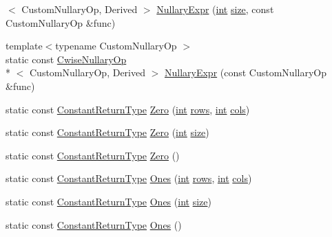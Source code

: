 \begin{DoxyCompactItemize}
$<$ Custom\-Nullary\-Op, Derived $>$ \hyperlink{class_matrix_base_ab4e21b9cfde1b10b11f083f8abf94bb7}{Nullary\-Expr} (\hyperlink{ioapi_8h_a787fa3cf048117ba7123753c1e74fcd6}{int} \hyperlink{glext_8h_a014d89bd76f74ef3a29c8f04b473eb76}{size}, const Custom\-Nullary\-Op \&func)
\item 
{\footnotesize template$<$typename Custom\-Nullary\-Op $>$ }\\static const \hyperlink{class_cwise_nullary_op}{Cwise\-Nullary\-Op}\\*
$<$ Custom\-Nullary\-Op, Derived $>$ \hyperlink{class_matrix_base_a87527d29571c883b86641ddc9cea57eb}{Nullary\-Expr} (const Custom\-Nullary\-Op \&func)
\item 
static const \hyperlink{class_matrix_base_aa9bcfa09043d1337c3575f008d3e04da}{Constant\-Return\-Type} \hyperlink{class_matrix_base_a29517bfa81dd52a8c7302d1902a99c2a}{Zero} (\hyperlink{ioapi_8h_a787fa3cf048117ba7123753c1e74fcd6}{int} \hyperlink{class_matrix_base_ae82810ba95da637cdf434b4274083723}{rows}, \hyperlink{ioapi_8h_a787fa3cf048117ba7123753c1e74fcd6}{int} \hyperlink{class_matrix_base_abe5381b539f87237647bc651a1ac0364}{cols})
\item 
static const \hyperlink{class_matrix_base_aa9bcfa09043d1337c3575f008d3e04da}{Constant\-Return\-Type} \hyperlink{class_matrix_base_a2b608114f7a813907b66ea1bb0dd33a3}{Zero} (\hyperlink{ioapi_8h_a787fa3cf048117ba7123753c1e74fcd6}{int} \hyperlink{glext_8h_a014d89bd76f74ef3a29c8f04b473eb76}{size})
\item 
static const \hyperlink{class_matrix_base_aa9bcfa09043d1337c3575f008d3e04da}{Constant\-Return\-Type} \hyperlink{class_matrix_base_a80d399408db12eb60957efa2d7e8d4a9}{Zero} ()
\item 
static const \hyperlink{class_matrix_base_aa9bcfa09043d1337c3575f008d3e04da}{Constant\-Return\-Type} \hyperlink{class_matrix_base_a9bbc0f02d3435200469bdc2c07b0121f}{Ones} (\hyperlink{ioapi_8h_a787fa3cf048117ba7123753c1e74fcd6}{int} \hyperlink{class_matrix_base_ae82810ba95da637cdf434b4274083723}{rows}, \hyperlink{ioapi_8h_a787fa3cf048117ba7123753c1e74fcd6}{int} \hyperlink{class_matrix_base_abe5381b539f87237647bc651a1ac0364}{cols})
\item 
static const \hyperlink{class_matrix_base_aa9bcfa09043d1337c3575f008d3e04da}{Constant\-Return\-Type} \hyperlink{class_matrix_base_a29c5c34c077be6a7651375b77c30b95d}{Ones} (\hyperlink{ioapi_8h_a787fa3cf048117ba7123753c1e74fcd6}{int} \hyperlink{glext_8h_a014d89bd76f74ef3a29c8f04b473eb76}{size})
\item 
static const \hyperlink{class_matrix_base_aa9bcfa09043d1337c3575f008d3e04da}{Constant\-Return\-Type} \hyperlink{class_matrix_base_a6ea7fe1ebd5eb078bcafa2c00d5c4021}{Ones} ()

\end{DoxyCompactItemize}
